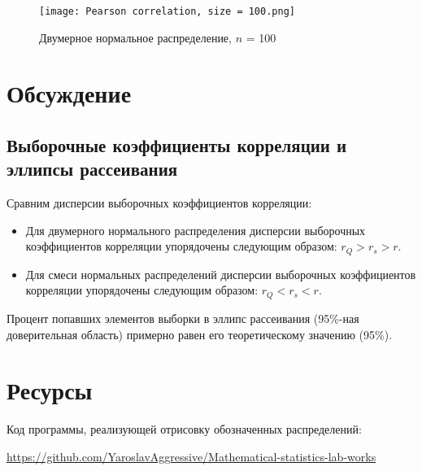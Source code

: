 \documentclass[a4paper]{article}
\begin{document}
         \begin{figure}[H]
            \centering
            \texttt{[image: Pearson correlation, size = 100.png]}
            \caption{Двумерное нормальное распределение, $n$ = 100}
            \label{fig:pearson_100}
        \end{figure}
    
\section{Обсуждение}

    \subsection{Выборочные коэффициенты корреляции и эллипсы рассеивания}
    
       Сравним дисперсии выборочных коэффициентов корреляции: \\
       
       \begin{itemize}
           \item Для двумерного нормального распределения дисперсии выборочных коэффициентов корреляции упорядочены следующим образом: $r_Q > r_s > r$.  \\
           \item Для смеси нормальных распределений дисперсии выборочных коэффициентов корреляции упорядочены следующим образом: $r_Q < r_s < r$.  \\
       \end{itemize}
        
        Процент попавших элементов выборки в эллипс рассеивания (95\%-ная доверительная область) примерно равен его теоретическому значению (95\%). \\

\section{Ресурсы}
    \begin{spacing}{2.5}
        Код программы, реализующей отрисовку обозначенных распределений:
        
        \href{https://github.com/YaroslavAggressive/Mathematical-statistics-lab-works}{https://github.com/YaroslavAggressive/Mathematical-statistics-lab-works}
    \end{spacing}
    
\end{document}
